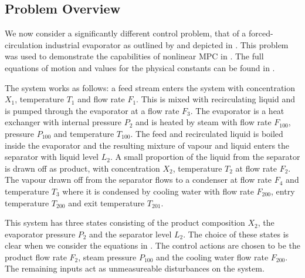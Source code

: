 \subsection{Problem Overview}
We now consider a significantly different control problem, that of a forced-circulation industrial evaporator as outlined by \cite{NeLe89} and depicted in . This problem was used to demonstrate the capabilities of nonlinear MPC in \cite{Mac02}. The full equations of motion and values for the physical constants can be found in .

The system works as follows: a feed stream enters the system with concentration $X_1$, temperature $T_1$ and flow rate $F_1$. This is mixed with recirculating liquid and is pumped through the evaporator at a flow rate $F_3$. The evaporator is a heat exchanger with internal pressure $P_2$ and is heated by steam with flow rate $F_{100}$, pressure $P_{100}$ and temperature $T_{100}$. The feed and recirculated liquid is boiled inside the evaporator and the resulting mixture of vapour and liquid enters the separator with liquid level $L_2$. A small proportion of the liquid from the separator is drawn off as product, with concentration $X_2$, temperature $T_2$ at flow rate $F_2$. The vapour drawn off from the separator flows to a condenser at flow rate $F_4$ and temperature $T_3$ where it is condensed by cooling water with flow rate $F_{200}$, entry temperature $T_{200}$ and exit temperature $T_{201}$.




This system has three states consisting of the product composition $X_2$, the evaporator pressure $P_2$ and the separator level $L_2$. The choice of these states is clear when we consider the equations in . The control actions are chosen to be the product flow rate $F_2$, steam pressure $P_{100}$ and the cooling water flow rate $F_{200}$. The remaining inputs act as unmeasureable disturbances on the system.


